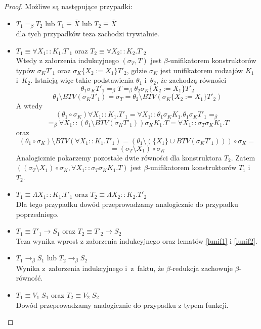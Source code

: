 \documentclass[11pt,leqno]{article}
\begin{document}
\begin{proof}
Możliwe są następujące przypadki:
\begin{itemize}
\item $T_1 =_\beta T_2$ lub $T_1 \equiv \bar{X}$ lub $T_2 \equiv \bar{X}$ \\
dla tych przypadków teza zachodzi trywialnie.
\item $T_1 \equiv \forall X_1::K_1.T'_1$ oraz $T_2 \equiv \forall X_2::K_2.T'_2$ \\
Wtedy z załorzenia indukcyjnego $(\sigma_T, T)$ jest $\beta$-unifikatorem konstruktorów typów
$\sigma_K T'_1$ oraz $\sigma_K\{X_2:=X_1\}T'_2$, gdzie $\sigma_K$ jest unifikatorem rodzajów $K_1$ i~$K_2$.
Istnieją więc takie podstawienia $\theta_1$ i~$\theta_2$, że zachodzą równości
\[
\theta_1 \sigma_K T'_1 =_\beta T =_\beta \theta_2 \sigma_K \{X_2:=X_1\} T'_2
\]
\[
\theta_1 \setminus BTV(\sigma_K T'_1) = \sigma_T = \theta_2 \setminus BTV(\sigma_K \{X_2:=X_1\} T'_2)
\]
A wtedy
\[
(\theta_1 \circ \sigma_K)\forall X_1::K_1.T'_1 = \forall X_1::\theta_1\sigma_K K_1. \theta_1\sigma_K T'_1 =_\beta
\]
\[
=_\beta \forall X_1::(\theta_1 \setminus BTV(\sigma_K T'_1))\sigma_K K_1.T = \forall X_1::\sigma_T\sigma_K K_1.T
\]
oraz
\[
(\theta_1 \circ \sigma_K) \setminus BTV(\forall X_1::K_1.T'_1) = (\theta_1 \setminus (\{X_1\} \cup BTV(\sigma_K T'_1))) \circ \sigma_K =
\]
\[
= (\sigma_T \setminus X_1) \circ \sigma_K
\]
Analogicznie pokarzemy pozostałe dwie równości dla konstruktora $T_2$. Zatem 
$((\sigma_T \setminus X_1) \circ \sigma_K, \forall X_1::\sigma_T \sigma_K K_1.T)$ jest $\beta$-unifikatorem konstruktorów $T_1$ i~$T_2$.
\item $T_1 \equiv \Lambda X_1::K_1.T'_1$ oraz $T_2 \equiv \Lambda X_2::K_2.T'_2$ \\
Dla tego przypadku dowód przeprowadzamy analogicznie do przypadku poprzedniego.
\item $T_1 \equiv T'_1 \rightarrow S_1$ oraz $T_2 \equiv T'_2 \rightarrow S_2$ \\
Teza wynika wprost z załorzenia indukcyjnego oraz lematów \ref{lunif1} i \ref{lunif2}.
\item $T_1 \longrightarrow_\beta S_1$ lub $T_2 \longrightarrow_\beta S_2$ \\
Wynika z~załorzenia indukcyjnego i~z~faktu, że $\beta$-redukcja zachowuje $\beta$-równość.
\item $T_1 \equiv V_1\;S_1$ oraz $T_2 \equiv V_2\;S_2$ \\
Dowód przeprowadzamy analogicznie do przypadku z typem funkcji.
\end{itemize}
\end{proof}
\end{document}
